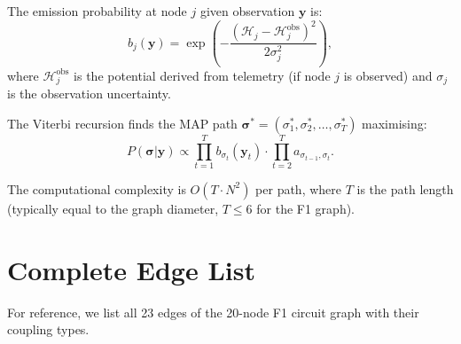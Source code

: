 \documentclass[twocolumn,10pt,a4paper]{article}
\theoremstyle{definition}
\theoremstyle{remark}
\newcommand{\Hcal}{\mathcal{H}}
\newcommand{\vect}[1]{\boldsymbol{#1}}
\begin{document}
The emission probability at node $j$ given observation $\vect{y}$ is:
\begin{equation}\label{eq:emission}
    b_j(\vect{y}) = \exp\left(-\frac{(\Hcal_j - \Hcal_j^{\mathrm{obs}})^2}{2\sigma_j^2}\right),
\end{equation}
where $\Hcal_j^{\mathrm{obs}}$ is the potential derived from telemetry (if node $j$ is observed) and $\sigma_j$ is the observation uncertainty.

The Viterbi recursion finds the MAP path $\vect{\sigma}^* = (\sigma_1^*, \sigma_2^*, \ldots, \sigma_T^*)$ maximising:
\begin{equation}\label{eq:map_path}
    P(\vect{\sigma} | \vect{y}) \propto \prod_{t=1}^{T} b_{\sigma_t}(\vect{y}_t) \cdot \prod_{t=2}^{T} a_{\sigma_{t-1}, \sigma_t}.
\end{equation}

The computational complexity is $O(T \cdot N^2)$ per path, where $T$ is the path length (typically equal to the graph diameter, $T \leq 6$ for the F1 graph).


\section{Complete Edge List}\label{app:edges}

For reference, we list all 23 edges of the 20-node F1 circuit graph with their coupling types.
\end{document}
